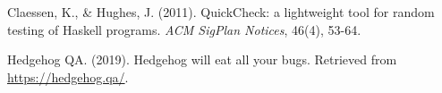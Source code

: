 \documentclass{scrartcl}
\begin{document}



\begin{thebibliography}{99}

Claessen, K., \& Hughes, J. (2011). QuickCheck: a lightweight tool for random
testing of Haskell programs. \textit{ACM SigPlan Notices}, 46(4), 53-64.

Hedgehog QA. (2019). Hedgehog will eat all your bugs. Retrieved from
\url{https://hedgehog.qa/}.

\end{thebibliography}
\end{document}
